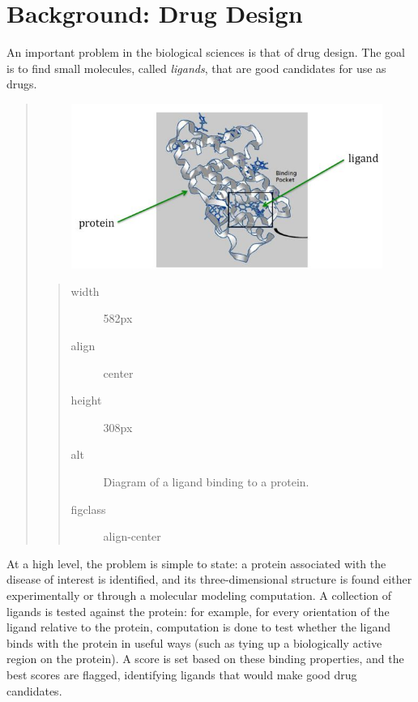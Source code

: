 \documentclass[letterpaper,10pt,openany,oneside]{sphinxmanual}
\begin{document}
\section{Background: Drug Design}
\label{intro/intro:background-drug-design}
An important problem in the biological sciences is that of drug design. The goal is to find small molecules, called \emph{ligands}, that are good candidates for use as drugs.
\begin{quote}
\begin{figure}[htbp]
\centering

\includegraphics{proteinligand.jpg}
\end{figure}
\begin{quote}\begin{description}
\item[{width}] \leavevmode
582px

\item[{align}] \leavevmode
center

\item[{height}] \leavevmode
308px

\item[{alt}] \leavevmode
Diagram of a ligand binding to a protein.

\item[{figclass}] \leavevmode
align-center

\end{description}\end{quote}
\end{quote}

At a high level, the problem is simple to state: a protein associated with the disease of interest is identified, and its three-dimensional structure is found either experimentally or through a molecular modeling computation. A collection of ligands is tested against the protein: for example, for every orientation of the ligand relative to the protein, computation is done to test whether the ligand binds with the protein in useful ways (such as tying up a biologically active region on the protein). A score is set based on these binding properties, and the best scores are flagged, identifying ligands that would make good drug candidates.
\end{document}

